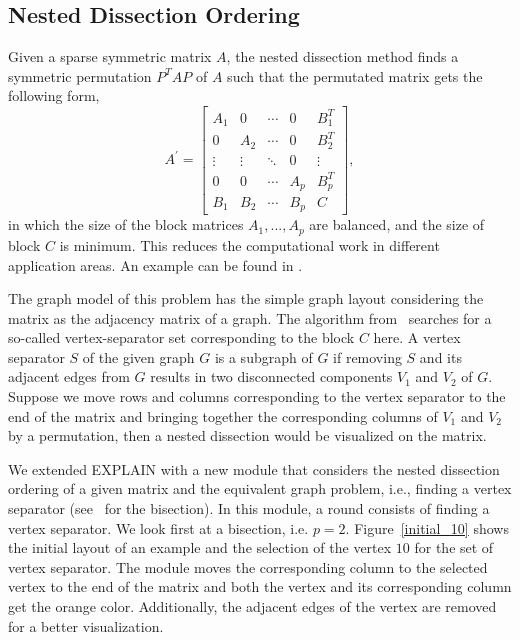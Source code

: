 \documentclass[11pt, twoside,a4paper]{book}
\begin{document}
\subsection{Nested Dissection Ordering}
Given a sparse symmetric matrix $A$, the nested dissection method finds a 
symmetric permutation $P^T A P$ of $A$ 
such that the permutated matrix gets the following form,
$$
A^{\prime} =
\begin{bmatrix}
A_1 & 0   & \cdots & 0 & B_1^T \\
0   & A_2 & \cdots & 0  & B_2^T \\
\vdots& \vdots & \ddots & 0 & \vdots \\
0   &   0 & \cdots & A_p & B_p^T \\
B_1 & B_2 & \cdots & B_p& C
\end{bmatrix},
$$
in which the size of the block matrices $A_1,...,A_p$ are balanced, 
and the size of block $C$ is minimum.
This reduces the computational work in different application areas.
An example can be found in \cite{2014:02}.

The graph model of this problem has the simple graph layout considering the matrix
as the adjacency matrix of a graph. 
The algorithm from~\cite{2014:02} searches for a so-called vertex-separator set
corresponding to the block $C$ here. A vertex separator $S$ of the given graph $G$ 
is a subgraph of $G$ if removing $S$ and its adjacent edges from $G$ results in two
disconnected components $V_1$ and $V_2$ of $G$. 
Suppose we move rows and columns corresponding to the vertex separator to the end of
the matrix and bringing together 
the corresponding columns of $V_1$ and $V_2$ by a permutation,
then a nested dissection would be visualized on the matrix.

We extended \mbox{EXPLAIN} with
a new module that considers the nested dissection ordering
of a given matrix and the equivalent graph problem, i.e.,
finding a vertex separator (see~\cite{2014:02} for the bisection). 
In this module, a round consists of finding a vertex separator.
We look first at a bisection, i.e. $p=2$. 
Figure~\ref{initial_10} shows the initial layout of an example 
and the selection of the vertex $10$ for the set of vertex separator. The module moves the 
corresponding column to the selected vertex to the end of the matrix
and both the vertex and its corresponding column get the orange color.
Additionally, the adjacent edges of the vertex are removed for a better visualization.
\end{document}
